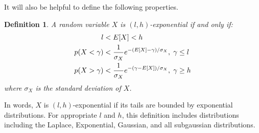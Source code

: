 \documentclass[]{article}
\newtheorem{definition}{Definition}[section]
\begin{document}
It will also be helpful to define the following properties.

\begin{definition}
A random variable $X$ is $(l, h)$-exponential if and only if:
\begin{align}
    l < \hspace{1mm} & E[X] < h \\
    p(X < \gamma) < \hspace{1mm} & \frac{1}{\sigma_X} e^{-(E[X] - \gamma) / \sigma_X}, \hspace{1mm} \gamma \le l \\
    p(X > \gamma) < \hspace{1mm} & \frac{1}{\sigma_X} e^{-(\gamma - E[X]) / \sigma_X}, \hspace{1mm} \gamma \ge h
\end{align}
where $\sigma_X$ is the standard deviation of $X$.
\end{definition}
In words, $X$ is $(l, h)$-exponential if its tails are bounded by exponential distributions. For appropriate $l$ and $h$, this definition includes distributions including the Laplace, Exponential, Gaussian, and all subgaussian distributions.


\end{document}
